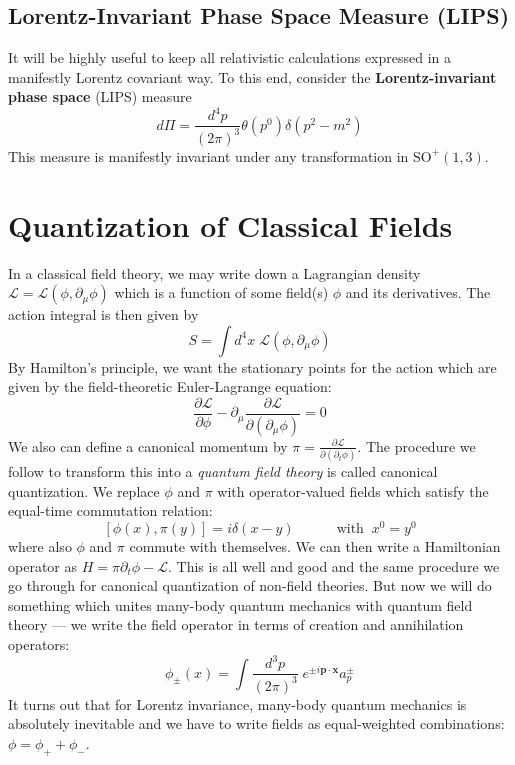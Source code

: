 \documentclass[onecolumn]{gwclass}
\def \*#1{\boldsymbol{#1}}
\renewcommand{\t}[1]{\text{#1}}
\begin{document}
\subsection{Lorentz-Invariant Phase Space Measure (LIPS)}
It will be highly useful to keep all relativistic calculations expressed in a manifestly Lorentz covariant way. To this end, consider the \textbf{Lorentz-invariant phase space} (LIPS) measure
$$ d\Pi = \frac{d^4p}{(2\pi)^3}\theta(p^0)\delta(p^2 - m^2) $$
This measure is manifestly invariant under any transformation in $\t{SO}^+(1,3)$. 



\section{Quantization of Classical Fields}
In a classical field theory, we may write down a Lagrangian density $\mathscr{L} = \mathscr{L}(\phi, \partial_\mu\phi)$ which is a function of some field(s) $\phi$ and its derivatives. The action integral is then given by
$$ S = \int d^4x\;\mathscr{L}(\phi,\partial_\mu\phi) $$ 
By Hamilton's principle, we want the stationary points for the action which are given by the field-theoretic Euler-Lagrange equation:
$$ \frac{\partial\mathscr{L}}{\partial \phi} - \partial_\mu\frac{\partial \mathscr{L}}{\partial(\partial_\mu\phi)} = 0 $$
We also can define a canonical momentum by $\pi=\frac{\partial\mathscr{L}}{\partial(\partial_t\phi)}$. The procedure we follow to transform this into a \emph{quantum field theory} is called canonical quantization. We replace $\phi$ and $\pi$ with operator-valued fields which satisfy the equal-time commutation relation:
$$[\phi(x), \pi(y)]= i\delta(x-y) \quad\quad\quad\t{with }\: x^0=y^0$$
where also $\phi$ and $\pi$ commute with themselves. We can then write a Hamiltonian operator as $ H = \pi\partial_t\phi - \mathscr{L} $. This is all well and good and the same procedure we go through for canonical quantization of non-field theories. But now we will do something which unites many-body quantum mechanics with quantum field theory --- we write the field operator in terms of creation and annihilation operators:
$$ \phi_\pm(x) = \int\frac{d^3p}{(2\pi)^3}\;e^{\pm i\*p\cdot\*x}a^\pm_p $$
It turns out that for Lorentz invariance, many-body quantum mechanics is absolutely inevitable and we have to write fields as equal-weighted combinations: $\phi = \phi_+ + \phi_-$.
\end{document}
